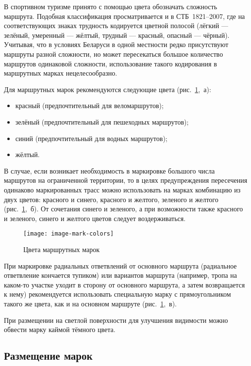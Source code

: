 \documentclass[a5paper,10pt,titlepage]{extarticle}
\begin{document}
В спортивном туризме принято с помощью цвета обозначать сложность маршрута. Подобная классификация просматривается и в
СТБ~1821--2007, где на соответствующих знаках трудность кодируется цветной полосой  (лёгкий --- зелёный, умеренный ---
жёлтый, трудный --- красный, опасный --- чёрный). Учитывая, что в условиях Беларуси в одной местности редко присутствуют
маршруты разной сложности, но может пересекаться большое количество маршрутов одинаковой сложности, использование такого
кодирования в маршрутных марках нецелесообразно.

Для маршрутных марок рекомендуются следующие цвета (рис.~\ref{fig:mark-colors},~а):
\begin{itemize}
	\item красный (предпочтительный для веломаршрутов);
	\item зелёный (предпочтительный для пешеходных маршрутов);
	\item синий (предпочтительный для водных маршрутов);
	\item жёлтый.
\end{itemize}

В случае, если возникает необходимость в маркировке большого числа маршрутов на ограниченной территории, то в целях
предупреждения пересечения одинаково маркированных трасс можно использовать на марках комбинацию из двух цветов:
красного и синего, красного и желтого, зеленого и желтого (рис.~\ref{fig:mark-colors},~б). От сочетания синего и зеленого, а при возможности
также красного и зеленого, синего и желтого цветов следует воздерживаться.

\begin{figure}[ht]
	\centering
	\texttt{[image: image-mark-colors]}
	\caption{Цвета маршрутных марок}\label{fig:mark-colors}
\end{figure}


При маркировке радиальных ответвлений от основного маршрута (радиальное ответвление кончается тупиком) или вариантов
маршрута (например, тропа на каком-то участке уходит в сторону от основного маршрута, а затем возвращается к нему)
рекомендуется использовать специальную марку с прямоугольником такого же цвета, как и на основном маршруте (рис.~\ref{fig:mark-colors},~в).

При размещении на светлой поверхности для улучшения видимости можно обвести марку каймой тёмного цвета.

\subsection{Размещение марок}
\end{document}
